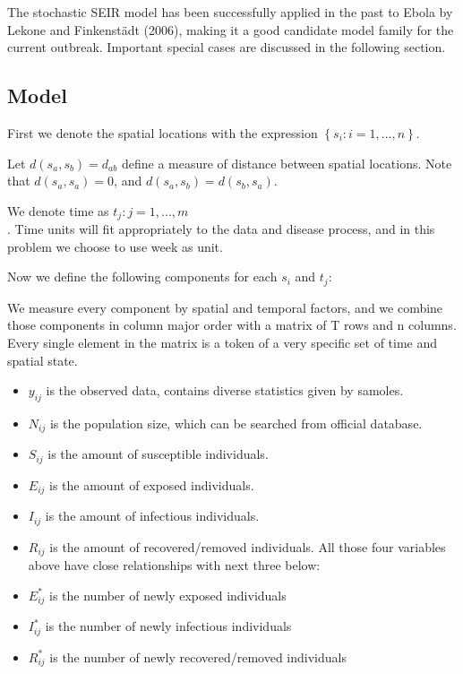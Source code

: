 \documentclass[11pt]{article}
\begin{document}
The stochastic SEIR model has been successfully applied in the past to Ebola by Lekone and Finkenst{\"a}dt (2006), making it a good candidate model family for the current outbreak. 
Important special cases are discussed in the following section.



\subsection{Model}

First we denote the spatial locations with the expression $\left\{s_i : i = 1, ...,n \right\}$.

Let $d(s_a, s_b) = d_{ab}$ define a measure of distance between spatial locations. Note that $d(s_a, s_a) = 0$, and $d(s_a, s_b) = d(s_b, s_a)$.
        
        We denote time as ${t_j : j = 1, ...,m}$ \\. Time units will fit appropriately to the data and disease process, and in this problem we choose to use week as unit.


 Now we define the following components for each $s_i$ and $t_j$:

We measure every component by spatial and temporal factors, and we combine those components in column major order with a matrix of T rows and n columns. Every single element in the matrix is a token of a very specific set of time and spatial state. 

\begin{itemize}
            \item {$y_{ij}$} is the observed data, contains diverse statistics given by samoles.
            \item {${N_{ij}}$} is the population size, which can be searched from official database.
            \item {${S_{ij}}$} is the amount of susceptible individuals.
            \item {${E_{ij}}$} is the amount of exposed individuals.
            \item {${I_{ij}}$} is the amount of infectious individuals.
            \item {${R_{ij}}$} is the amount of recovered/removed individuals. All those four variables above have close relationships with next three below: 
            
            \item {${E^*_{ij}}$} is the number of newly exposed individuals
            \item {${I^*_{ij}}$} is the number of newly infectious individuals
            \item {${R^*_{ij}}$} is the number of newly recovered/removed individuals
        \end{itemize}
        
\end{document}
